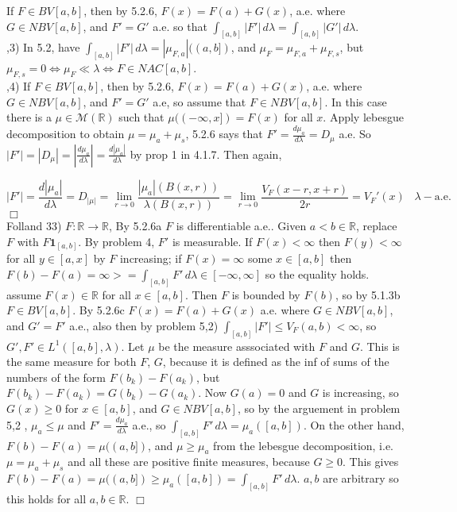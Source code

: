 \documentclass[12pt]{article}
\newcommand{\reals}[0] { \mathbb{R}}
\newcommand{\M}[0] { \mathcal{M} }
\newcommand{\lrimply}[0] { \Leftrightarrow }
\newcommand{\rarw}[0] { \rightarrow }
\newcommand{ \cf }[1] { \mathbf{1}_{#1} }
\begin{document}
\noindent
If $F \in BV[a,b]$, then by 5.2.6, $F(x) = F(a) + G(x)$, a.e. where $G \in NBV[a,b]$, and $F'=G'$ a.e. so that $\int_{[a,b]} |F'| \, d\lambda = \int_{[a,b]} |G'| \, d\lambda$. \\


,3) In 5.2, have $\int_{[a,b]} |F'| \, d\lambda = |\mu_{F,a}|((a,b])$, and $\mu_{F} = \mu_{F,a} + \mu_{F,s}$, but $\mu_{F,s} = 0 \lrimply \mu_{F} \ll \lambda \lrimply F \in NAC[a,b]$. \\

,4) If $F \in BV[a,b]$, then by 5.2.6, $F(x) = F(a) + G(x)$, a.e. where $G \in NBV[a,b]$, and $F'=G'$ a.e, so assume that $F \in NBV[a,b]$. In this case there is a $\mu \in \M(\reals)$ such that $\mu((-\infty,x]) = F(x)$ for all $x$. Apply lebesgue decomposition to obtain $\mu = \mu_a + \mu_s$, 5.2.6 says that $F' = \frac{d\mu_a}{d\lambda} = D_\mu$ a.e. So $|F'| = |D_\mu|= |\frac{d\mu_a}{d\lambda}| = \frac{d|\mu_a|}{d\lambda}$ by prop 1 in 4.1.7. Then again,


$$
|F'| = \frac{d|\mu_a|}{d\lambda} = D_{|\mu|} = \lim_{r \rarw 0} \frac{ |\mu_a|(B(x,r))}{ \lambda(B(x,r))} = \lim_{r \rarw 0} \frac{ V_F(x-r,x+r) }{2r}  = V_F'(x) \; \; \;  \lambda-\textrm{a.e.}
$$ $\Box$ \\


\noindent
Folland 33) $F: \reals \rarw \reals$, By 5.2.6a $F$ is differentiable a.e.. Given $a<b \in \reals$, replace $F$ with $F \cf{[a,b]}$. By problem 4, $F'$ is measurable. If $F(x) < \infty$ then $F(y) < \infty$ for all $y \in [a,x]$ by $F$ increasing; if $F(x) = \infty$ some $x \in [a,b]$ then $F(b) - F(a) = \infty >= \int_{[a,b]} F' \, d\lambda \in [-\infty,\infty]$ so the equality holds. assume $F(x) \in \reals$ for all $x \in [a,b]$. Then $F$ is bounded by $F(b)$, so by 5.1.3b $F \in BV[a,b]$. By 5.2.6c $F(x) = F(a) + G(x)$ a.e. where $G \in NBV[a,b]$, and $G' = F'$ a.e., also then by problem 5,2) $\int_{[a,b]} |F'| \le V_F(a,b) < \infty$, so $G',F' \in L^1([a,b],\lambda)$. Let $\mu$ be the measure asssociated with $F$ and $G$. This is the same measure for both $F$, $G$, because it is defined as the inf of sums of the numbers of the form $F(b_k)-F(a_k)$, but $F(b_k)-F(a_k) = G(b_k) - G(a_k)$. Now $G(a) = 0$ and $G$ is increasing, so $G(x) \ge 0$ for $x \in [a,b]$, and $G \in NBV[a,b]$, so by the arguement in problem 5,2 , $\mu_{a} \le \mu$ and $F' = \frac{d \mu_a}{d\lambda}$ a.e., so $\int_{[a,b]} F' \, d\lambda = \mu_a([a,b])$. On the other hand, $F(b) - F(a) = \mu((a,b])$, and $ \mu \ge \mu_a$ from the lebesgue decomposition, i.e. $\mu = \mu_a + \mu_s$ and all these are positive finite measures, because $G \ge 0$. This gives $F(b) - F(a) = \mu((a,b]) \ge \mu_a([a,b])  = \int_{[a,b]} F' \, d\lambda$. $a,b$ are arbitrary so this holds for all $a,b \in \reals$. $\Box$
\end{document}
